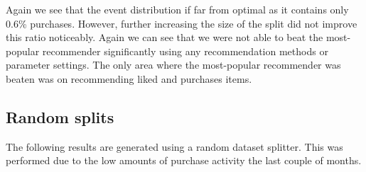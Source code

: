 
Again we see that the event distribution if far from optimal as it contains only 0.6\% purchases. However, further increasing the size of the split did not improve this ratio noticeably.
Again we can see that we were not able to beat the most-popular recommender significantly using any recommendation methods or parameter settings. The only area where the most-popular recommender
was beaten was on recommending liked and purchases items.


\subsection{Random splits}

The following results are generated using a random dataset splitter. This was performed due to the low amounts of purchase activity the last couple of months.


